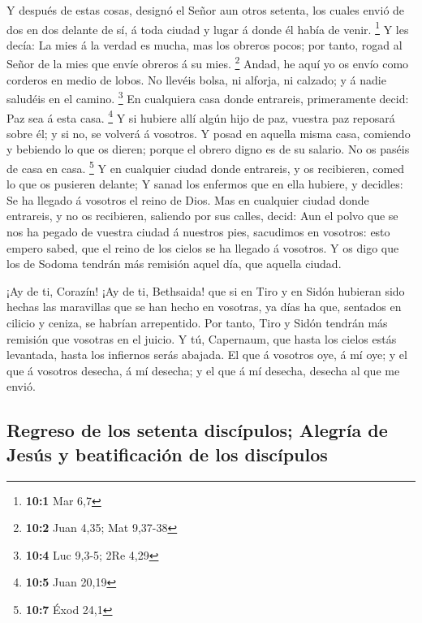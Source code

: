 Y después de estas cosas, designó el Señor aun otros
setenta, los cuales envió de dos en dos delante de sí, á toda ciudad y
lugar á donde él había de venir. \footnote{\textbf{10:1} Mar 6,7}
 Y les decía: La mies á la verdad es mucha, mas los
obreros pocos; por tanto, rogad al Señor de la mies que envíe obreros á
su mies. \footnote{\textbf{10:2} Juan 4,35; Mat 9,37-38} 
Andad, he aquí yo os envío como corderos en medio de lobos.
 No llevéis bolsa, ni alforja, ni calzado; y á nadie
saludéis en el camino. \footnote{\textbf{10:4} Luc 9,3-5; 2Re 4,29}
 En cualquiera casa donde entrareis, primeramente decid:
Paz sea á esta casa. \footnote{\textbf{10:5} Juan 20,19} 
Y si hubiere allí algún hijo de paz, vuestra paz reposará sobre él; y si
no, se volverá á vosotros.  Y posad en aquella misma casa,
comiendo y bebiendo lo que os dieren; porque el obrero digno es de su
salario. No os paséis de casa en casa. \footnote{\textbf{10:7} Éxod 24,1}
 Y en cualquier ciudad donde entrareis, y os recibieren,
comed lo que os pusieren delante;  Y sanad los enfermos
que en ella hubiere, y decidles: Se ha llegado á vosotros el reino de
Dios.  Mas en cualquier ciudad donde entrareis, y no os
recibieren, saliendo por sus calles, decid:  Aun el polvo
que se nos ha pegado de vuestra ciudad á nuestros pies, sacudimos en
vosotros: esto empero sabed, que el reino de los cielos se ha llegado á
vosotros.  Y os digo que los de Sodoma tendrán más
remisión aquel día, que aquella ciudad.

 ¡Ay de ti, Corazín! ¡Ay de ti, Bethsaida! que si en Tiro
y en Sidón hubieran sido hechas las maravillas que se han hecho en
vosotras, ya días ha que, sentados en cilicio y ceniza, se habrían
arrepentido.  Por tanto, Tiro y Sidón tendrán más
remisión que vosotras en el juicio.  Y tú, Capernaum, que
hasta los cielos estás levantada, hasta los infiernos serás abajada.
 El que á vosotros oye, á mí oye; y el que á vosotros
desecha, á mí desecha; y el que á mí desecha, desecha al que me envió.

\hypertarget{regreso-de-los-setenta-discuxedpulos-alegruxeda-de-jesuxfas-y-beatificaciuxf3n-de-los-discuxedpulos}{%
\subsection{Regreso de los setenta discípulos; Alegría de Jesús y
beatificación de los
discípulos}\label{regreso-de-los-setenta-discuxedpulos-alegruxeda-de-jesuxfas-y-beatificaciuxf3n-de-los-discuxedpulos}}

